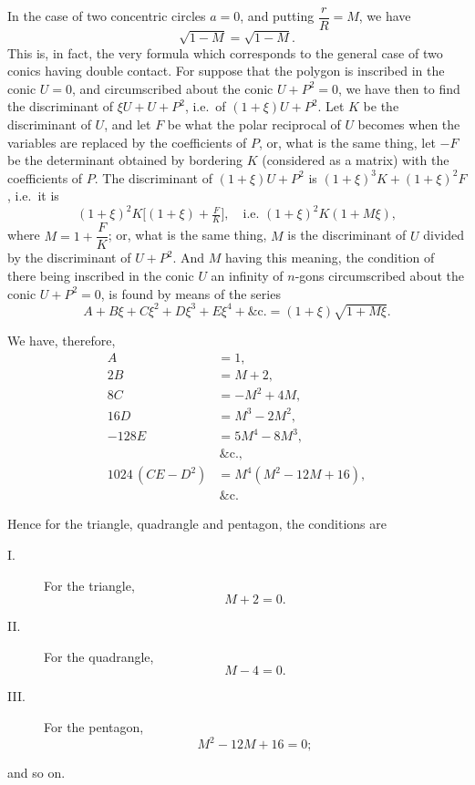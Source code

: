 \documentclass[11pt,a4paper]{article}
\begin{document}
In the case of two concentric circles $a = 0$, and putting $\dfrac{r}{R} = M$, we have
\[
\sqrt{1-M} = \sqrt{1-M}.
\]
This is, in fact, the very formula which corresponds to the general case of two conics having double contact. For suppose that the polygon is inscribed in the conic $U = 0$, and circumscribed about the conic $U + P^2 = 0$, we have then to find the discriminant of $\xi U + U + P^2$, i.e.\ of $(1+\xi)U + P^2$. Let $K$ be the discriminant of $U$, and let $F$ be what the polar reciprocal of $U$ becomes when the variables are replaced by the coefficients of $P$, or, what is the same thing, let $-F$ be the determinant obtained by bordering $K$ (considered as a matrix) with the coefficients of $P$. The discriminant of $(1+\xi)U + P^2$ is $(1+\xi)^3 K + (1+\xi)^2 F$, i.e.\ it is
\[
(1+\xi)^2 K \bigl[ (1+\xi) + \tfrac{F}{K}\bigr],\quad\text{i.e.\ } (1+\xi)^2 K (1 + M\xi),
\]
where $M = 1 + \dfrac{F}{K}$; or, what is the same thing, $M$ is the discriminant of $U$ divided by the discriminant of $U + P^2$. And $M$ having this meaning, the condition of there being inscribed in the conic $U$ an infinity of $n$-gons circumscribed about the conic $U + P^2 = 0$, is found by means of the series
\[
A + B\xi + C\xi^2 + D\xi^3 + E\xi^4 + \&\mathrm{c}. = (1+\xi)\sqrt{1+M\xi}.
\]

\medskip

We have, therefore,
\begin{align*}
A &= 1,\\
2B &= M + 2,\\
8C &= -M^2 + 4M,\\
16 D &= M^3 - 2M^2,\\
-128 E &= 5M^4 - 8M^3,\\
&\,\&\mathrm{c}.,\\
1024\,(CE - D^2) &= M^4(M^2 - 12M + 16),\\
&\,\&\mathrm{c}.
\end{align*}

\medskip

Hence for the triangle, quadrangle and pentagon, the conditions are
\begin{description}
\item[I.] For the triangle,
\[ M + 2 = 0. \]
\item[II.] For the quadrangle,
\[ M - 4 = 0. \]
\item[III.] For the pentagon,
\[ M^2 - 12M + 16 = 0; \]
\end{description}
and so on.

\medskip
\end{document}
